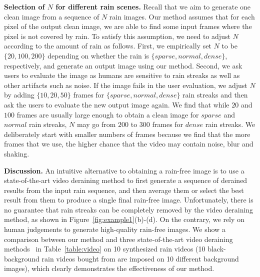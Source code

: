 \documentclass[10pt,twocolumn,letterpaper]{article}
\begin{document}
{\bf Selection of $N$ for different rain scenes.} Recall that we aim to generate one clean image from a sequence of $N$ rain images. Our method assumes that for each pixel of the output clean image, we are able to find some input frames where the pixel is not covered by rain. To satisfy this assumption, we need to adjust $N$ according to the amount of rain as follows.
First, we empirically set $N$ to be $\{20, 100, 200\}$ depending on whether the rain is $\{sparse, normal, dense\}$, respectively, and generate an output image using our method.
Second, we ask users to evaluate the image as humans are sensitive to rain streaks as well as other artifacts such as noise.
If the image fails in the user evaluation, we adjust $N$ by adding $\{10, 20, 50\}$ frames for $\{sparse, normal, dense\}$ rain streaks and then ask the users to evaluate the new output image again.
We find that while $20$ and $100$ frames are usually large enough to obtain a clean image for $sparse$ and $normal$ rain streaks, $N$ may go from $200$ to $300$ frames for $dense$ rain streaks. We deliberately start with smaller numbers of frames because we find that the more frames that we use, the higher chance that the video may contain noise, blur and shaking.

{\bf Discussion.} An intuitive alternative to obtaining a rain-free image is to use a state-of-the-art video deraining method to first generate a sequence of derained results from the input rain sequence, and then average them or select the best result from them to produce a single final rain-free image. Unfortunately, there is no guarantee that rain streaks can be completely removed by the video deraining method, as shown in Figure~\ref{fig:example1}(b)-(d). 
On the contrary, we rely on human judgements to generate high-quality rain-free images.
We show a comparison between our method and three state-of-the-art video deraining methods~\cite{jiang:cvpr:2017:dip,wei:iccv:2017:ds,li:cvpr:2018:mcsc} in Table~\ref{table:video} on 10 synthesized rain videos (10 black-background rain videos bought from \cite{rainstreaks} are imposed on 10 different background images), which clearly demonstrates the effectiveness of our method.


\begin{table}[t]
\centering
{}
\caption{Comparison with the state-of-the-art video deraining methods. In each method, we select the frame of highest PSNR for comparison. The average PSNR/SSIM are in brackets.}
\label{table:video}
\vspace{-4mm}
\end{table}
\end{document}
